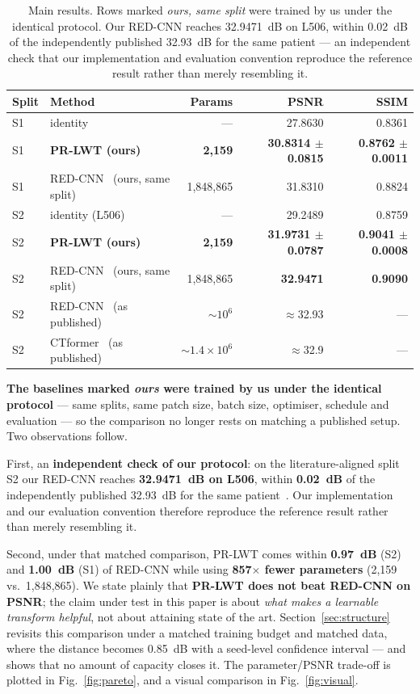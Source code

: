 \documentclass[conference]{IEEEtran}
\begin{document}
\begin{table}[t]
\centering
\caption{Main results. Rows marked \emph{ours, same split} were trained by us
under the identical protocol. Our RED-CNN reaches 32.9471~dB on L506, within
0.02~dB of the independently published 32.93~dB for the same patient
--- an independent check that our implementation and evaluation convention
reproduce the reference result rather than merely resembling it.}
\label{tab:main}
\small
\begin{tabular}{@{}llrrr@{}}
\toprule
Split & Method & Params & PSNR & SSIM\\
\midrule
S1 & identity & --- & 27.8630 & 0.8361\\
S1 & \textbf{PR-LWT (ours)} & \textbf{2,159} & \textbf{30.8314 $\pm$ 0.0815} & \textbf{0.8762 $\pm$ 0.0011}\\
S1 & RED-CNN~\cite{chen2017redcnn} (ours, same split) & 1,848,865 & 31.8310 & 0.8824\\
\midrule
S2 & identity (L506) & --- & 29.2489 & 0.8759\\
S2 & \textbf{PR-LWT (ours)} & \textbf{2,159} & \textbf{31.9731 $\pm$ 0.0787} & \textbf{0.9041 $\pm$ 0.0008}\\
S2 & RED-CNN~\cite{chen2017redcnn} (ours, same split) & 1,848,865 & \textbf{32.9471} & \textbf{0.9090}\\
\midrule
S2 & RED-CNN~\cite{chen2017redcnn} (as published) & $\sim\!10^6$ & $\approx$32.93 & ---\\
S2 & CTformer~\cite{wang2023ctformer} (as published) & $\sim\!1.4\times10^6$ & $\approx$32.9 & ---\\
\bottomrule
\end{tabular}
\end{table}

\textbf{The baselines marked \emph{ours} were trained by us under the identical
protocol} --- same splits, same patch size, batch size, optimiser, schedule and
evaluation --- so the comparison no longer rests on matching a published setup.
Two observations follow.

First, an \textbf{independent check of our protocol}: on the literature-aligned
split S2 our RED-CNN reaches \textbf{32.9471~dB on L506}, within \textbf{0.02~dB}
of the independently published 32.93~dB for the same patient~\cite{chen2017redcnn}.
Our implementation and our evaluation convention therefore reproduce the
reference result rather than merely resembling it.

Second, under that matched comparison, PR-LWT comes within \textbf{0.97~dB} (S2)
and \textbf{1.00~dB} (S1) of RED-CNN while using \textbf{857$\times$ fewer
parameters} (2,159 vs.\ 1,848,865). We state plainly that \textbf{PR-LWT does not
beat RED-CNN on PSNR}; the claim under test in this paper is about \emph{what
makes a learnable transform helpful}, not about attaining state of the art.
Section~\ref{sec:structure} revisits this comparison under a matched training
budget and matched data, where the distance becomes 0.85~dB with a seed-level
confidence interval --- and shows that no amount of capacity closes it. The
parameter/PSNR trade-off is plotted in Fig.~\ref{fig:pareto}, and a visual
comparison in Fig.~\ref{fig:visual}.
\end{document}
